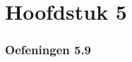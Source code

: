 \documentclass[lineaire_algebra_oplossingen.tex]{subfiles}
\begin{document}
\part{Hoofdstuk 5}
\section{Oefeningen 5.9}
\end{document}
